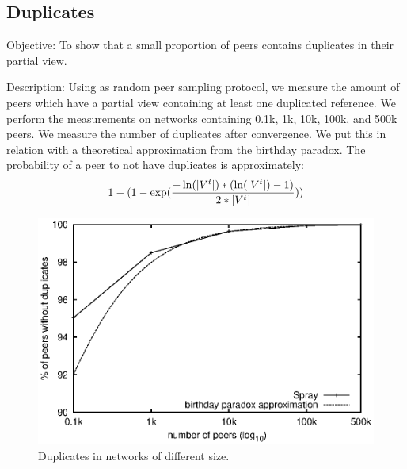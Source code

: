 
\subsection{Duplicates}

\begin{asparadesc} 
\item[Objective:] To show that a small proportion of peers contains duplicates
  in their partial view.
\item[Description:] Using \SPRAY as random peer sampling protocol, we measure
  the amount of peers which have a partial view containing at least one
  duplicated reference. We perform the measurements on networks containing
  0.1k, 1k, 10k, 100k, and 500k peers. We measure the number of duplicates
  after convergence. We put this in relation with a theoretical approximation
  from the birthday paradox. The probability of a peer to not have duplicates
  is approximately:
  \begin{equation*}
    1- 
    (1-
    \exp({-\ln(|V^t|)*(\ln(|V^t|)-1)\over{2*|V^t|}}))
  \end{equation*}

\begin{figure}
  \centering
  \includegraphics[width=\SCALE\textwidth]{img/duplicates.eps}
  \caption{\label{fig:duplicates}Duplicates in networks of different size.}
\end{figure}



\end{asparadesc}
